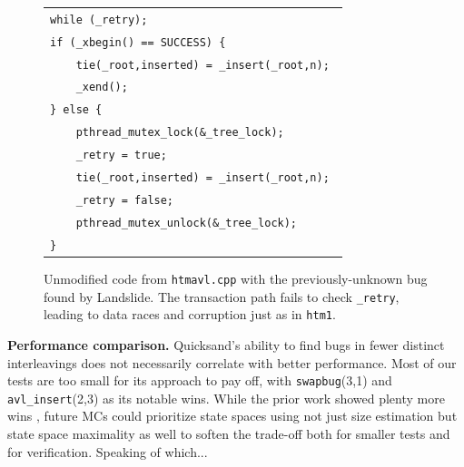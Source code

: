 \documentclass[10pt]{sigplanconf}
\begin{document}
\begin{figure}[t]
		\begin{tabular}{l}
		\texttt{while (\_retry);} \\
		\texttt{if (\_xbegin() == SUCCESS) \{} \\
		\texttt{~~~~tie(\_root,inserted) = \_insert(\_root,n); } \\
		\texttt{~~~~\_xend();} \\
		\texttt{\} else \{} \\
		\texttt{~~~~pthread\_mutex\_lock(\&\_tree\_lock);} \\
		\texttt{~~~~\_retry = true;} \\
		\texttt{~~~~tie(\_root,inserted) = \_insert(\_root,n); } \\
		\texttt{~~~~\_retry = false;} \\
		\texttt{~~~~pthread\_mutex\_unlock(\&\_tree\_lock);} \\
		\texttt{\}} \\
		\end{tabular}
	\caption{Unmodified code from {\tt htmavl.cpp} with the previously-unknown bug found by Landslide.
		The transaction path fails to check {\tt \_retry},
		leading to data races and corruption just as in {\tt htm1}.
		}
	\label{fig:avlbug}
\end{figure}

		{\bf Performance comparison.}
		Quicksand's ability to find bugs in fewer distinct interleavings %
		does not necessarily correlate with better performance. %
		Most of our tests are too small for its approach to pay off,
		with {\tt swapbug}(3,1) and {\tt avl\_insert}(2,3) as its notable wins.
		While the prior work showed plenty more wins \cite{quicksand},
		future MCs could prioritize state spaces using not just size estimation
		but state space maximality as well
		to soften the trade-off
		both for smaller tests and for verification.
Speaking of which...
\end{document}
